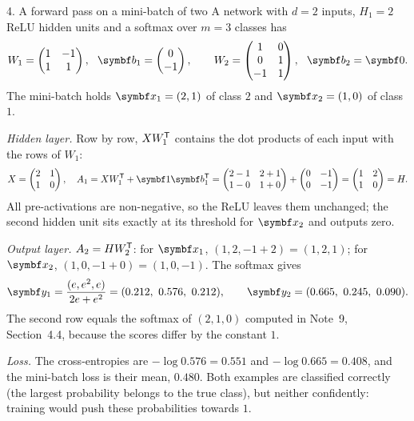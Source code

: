 \documentclass[11pt]{article}
\newcommand{\y}{\vect{y}}
\newcommand{\vb}{\vect{b}}
\begin{document}
\begin{worked}{4. A forward pass on a mini-batch of two}
A network with $d = 2$ inputs, $H_1 = 2$ ReLU hidden units and a softmax over $m = 3$ classes has
\[
  W_1 = \begin{pmatrix} 1 & -1 \\ 1 & 1 \end{pmatrix}, \ \ \vb_1 = \begin{pmatrix} 0 \\ -1 \end{pmatrix}, \qquad
  W_2 = \begin{pmatrix} 1 & 0 \\ 0 & 1 \\ -1 & 1 \end{pmatrix}, \ \ \vb_2 = \vect{0} .
\]
The mini-batch holds $\x_1 = (2, 1)$ of class $2$ and $\x_2 = (1, 0)$ of class $1$.

\emph{Hidden layer.} Row by row, $XW_1^{\mathsf{T}}$ contains the dot products of each input with the rows of $W_1$:
\[
  X = \begin{pmatrix} 2 & 1 \\ 1 & 0 \end{pmatrix}, \quad
  A_1 = XW_1\T + \vect{1}\vb_1\T = \begin{pmatrix} 2 - 1 & 2 + 1 \\ 1 - 0 & 1 + 0 \end{pmatrix} + \begin{pmatrix} 0 & -1 \\ 0 & -1 \end{pmatrix}
  = \begin{pmatrix} 1 & 2 \\ 1 & 0 \end{pmatrix} = H .
\]
All pre-activations are non-negative, so the ReLU leaves them unchanged; the second hidden unit sits exactly at its
threshold for $\x_2$ and outputs zero.

\emph{Output layer.} $A_2 = HW_2^{\mathsf{T}}$: for $\x_1$, $(1, 2, -1 + 2) = (1, 2, 1)$; for $\x_2$, $(1, 0, -1 + 0) = (1, 0, -1)$.
The softmax gives
\[
  \y_1 = \frac{(e, e^2, e)}{2e + e^2} = (0.212,\ 0.576,\ 0.212), \qquad \y_2 = (0.665,\ 0.245,\ 0.090) .
\]
The second row equals the softmax of $(2, 1, 0)$ computed in Note~9, Section~4.4, because the scores differ by the constant $1$.

\emph{Loss.} The cross-entropies are $-\log 0.576 = 0.551$ and $-\log 0.665 = 0.408$, and the mini-batch loss is
their mean, $0.480$. Both examples are classified correctly (the largest probability belongs to the true class), but
neither confidently: training would push these probabilities towards $1$.
\end{worked}
\end{document}
